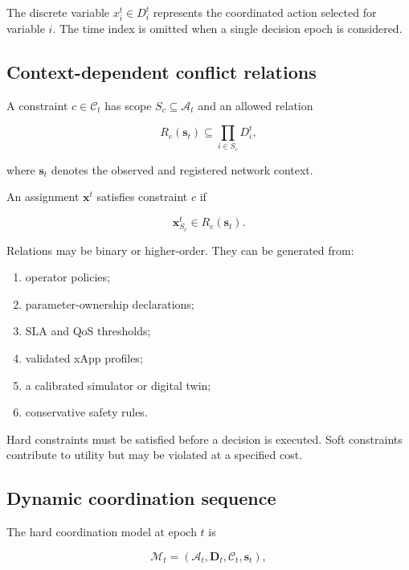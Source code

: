 \documentclass[pdflatex,sn-mathphys-num,iicol,oneside]{sn-jnl}
\begin{document}
The discrete variable $x_i^t\in D_i^t$ represents the coordinated
action selected for variable $i$. The time index is omitted when a
single decision epoch is considered.

\subsection{Context-dependent conflict relations}

A constraint $c\in\mathcal{C}_t$ has scope
$S_c\subseteq\mathcal{A}_t$ and an allowed relation

\begin{equation}
R_c(\bm{s}_t)
\subseteq
\prod_{i\in S_c}D_i^t,
\end{equation}

where $\bm{s}_t$ denotes the observed and registered network context.

An assignment $\bm{x}^t$ satisfies constraint $c$ if

\begin{equation}
\bm{x}_{S_c}^t
\in
R_c(\bm{s}_t).
\end{equation}

Relations may be binary or higher-order. They can be generated from:

\begin{enumerate}
    \item operator policies;
    \item parameter-ownership declarations;
    \item SLA and QoS thresholds;
    \item validated xApp profiles;
    \item a calibrated simulator or digital twin;
    \item conservative safety rules.
\end{enumerate}

Hard constraints must be satisfied before a decision is executed.
Soft constraints contribute to utility but may be violated at a
specified cost.

\subsection{Dynamic coordination sequence}

The hard coordination model at epoch $t$ is

\begin{equation}
\mathcal{M}_t
=
\left(
\mathcal{A}_t,
\bm{D}_t,
\mathcal{C}_t,
\bm{s}_t
\right),
\end{equation}
\end{document}
